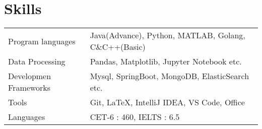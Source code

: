 \documentclass[a4paper,12pt,UTF8]{article}
\begin{document}

\section{Skills}
\begin{tabularx}{\linewidth}{@{}l X@{}}
    Program languages & Java(Advance), Python, MATLAB, Golang, C\&C++(Basic)\\
    Data Processing &  Pandas, Matplotlib, Jupyter Notebook etc.\\
    Developmen Frameworks & Mysql, SpringBoot, MongoDB, ElasticSearch etc.\\
    Tools &  Git, \LaTeX, IntelliJ IDEA, VS Code, Office\\
    Languages  &  \normalsize{CET-6 : 460, IELTS : 6.5}\\  
\end{tabularx}

\vfill

\fancyhf{}
\renewcommand{\headrulewidth}{0pt}

\setlength{\footskip}{20pt} 
\fancyfoot{}
\end{document}

